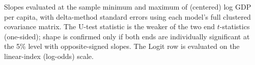 \begin{table}[htbp]
\centering
\caption{Lind--Mehlum (2010) U-Test: m6, lm6, and the Extensive-Margin Logit}
\label{tab:table10}
\par\smallskip\footnotesize Slopes evaluated at the sample minimum and maximum of (centered) log GDP per capita, with delta-method standard errors using each model's full clustered covariance matrix. The U-test statistic is the weaker of the two end $t$-statistics (one-sided); shape is confirmed only if both ends are individually significant at the 5\% level with opposite-signed slopes. The Logit row is evaluated on the linear-index (log-odds) scale.
\end{table}